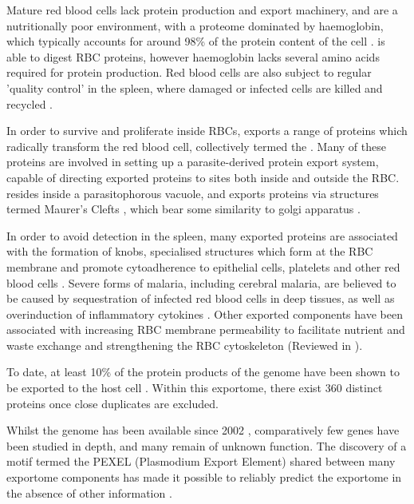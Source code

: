 \documentclass[fleqn,10pt]{article} %
\begin{document}
Mature red blood cells lack protein production and export machinery, and are a nutritionally poor environment, with a proteome dominated by haemoglobin, which typically accounts for around 98\% of the protein content of the cell \cite{DAlessandro2010}. \pf is able to digest RBC proteins, however haemoglobin lacks several amino acids required for protein production. Red blood cells are also  subject to regular 'quality control' in the spleen, where damaged or infected cells are killed and recycled \cite{Elsworth2014}.

In order to survive and proliferate inside RBCs, \pf exports a range of proteins which radically transform the red blood cell, collectively termed the . Many of these proteins are involved in setting up a parasite-derived protein export system, capable of directing exported \pf proteins to sites both inside and outside the RBC. \pf resides inside a parasitophorous vacuole, and exports proteins via structures termed Maurer's Clefts \cite{Marti2013}, which bear some similarity to golgi apparatus \cite{Mundwiler-Pachlatko2013}.

In order to avoid detection in the spleen, many exported proteins are associated with the formation of knobs, specialised structures which form at the RBC membrane and promote cytoadherence to epithelial cells, platelets and other red blood cells \cite{Kraemer2006}. Severe forms of malaria, including cerebral malaria, are believed to be caused by sequestration of infected red blood cells in deep tissues, as well as overinduction of inflammatory cytokines \cite{Chen2000}. Other exported components have been associated with increasing RBC membrane permeability to facilitate nutrient and waste exchange and strengthening the RBC cytoskeleton (Reviewed in \cite{Elsworth2014}). 

To date, at least 10\% of the protein products of the \pf genome have been shown to be exported to the host cell \cite{Boddey2013a}. Within this exportome, there exist 360 distinct proteins once close duplicates are excluded.

Whilst the \pf genome has been available since 2002 \cite{Gardner2002}, comparatively few genes have been studied in depth, and many remain of unknown function. The discovery of a motif termed the PEXEL (Plasmodium Export Element) shared between many exportome components has made it possible to reliably predict the \pf exportome in the absence of other information \cite{Sargeant2006}.
\end{document}
